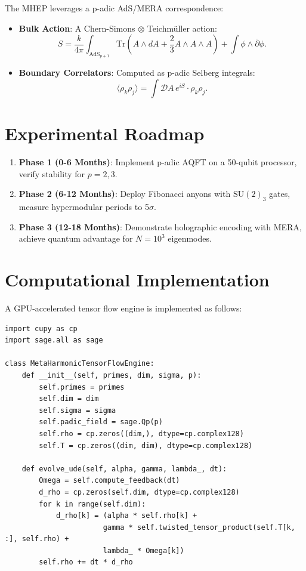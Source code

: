 \documentclass[11pt]{article}
\theoremstyle{plain}
\theoremstyle{definition}
\begin{document}
The MHEP leverages a p-adic AdS/MERA correspondence:
\begin{itemize}
    \item \textbf{Bulk Action}: A Chern-Simons \(\otimes\) Teichmüller action:
    \[
    S = \frac{k}{4\pi} \int_{\text{AdS}_{p+1}} \text{Tr}(A \wedge dA + \frac{2}{3} A \wedge A \wedge A) + \int \phi \wedge \overline{\partial} \phi.
    \]
    \item \textbf{Boundary Correlators}: Computed as p-adic Selberg integrals:
    \[
    \langle \rho_k \rho_j \rangle = \int \mathcal{D}A \, e^{i S} \cdot \rho_k \rho_j.
    \]
\end{itemize}

\section{Experimental Roadmap}

\begin{enumerate}
    \item \textbf{Phase 1 (0-6 Months)}: Implement p-adic AQFT on a 50-qubit processor, verify stability for \(p = 2, 3\).
    \item \textbf{Phase 2 (6-12 Months)}: Deploy Fibonacci anyons with \(\text{SU}(2)_3\) gates, measure hypermodular periods to 5\(\sigma\).
    \item \textbf{Phase 3 (12-18 Months)}: Demonstrate holographic encoding with MERA, achieve quantum advantage for \(N = 10^3\) eigenmodes.
\end{enumerate}

\section{Computational Implementation}
A GPU-accelerated tensor flow engine is implemented as follows:

\begin{verbatim}
import cupy as cp
import sage.all as sage

class MetaHarmonicTensorFlowEngine:
    def __init__(self, primes, dim, sigma, p):
        self.primes = primes
        self.dim = dim
        self.sigma = sigma
        self.padic_field = sage.Qp(p)
        self.rho = cp.zeros((dim,), dtype=cp.complex128)
        self.T = cp.zeros((dim, dim), dtype=cp.complex128)
    
    def evolve_ude(self, alpha, gamma, lambda_, dt):
        Omega = self.compute_feedback(dt)
        d_rho = cp.zeros(self.dim, dtype=cp.complex128)
        for k in range(self.dim):
            d_rho[k] = (alpha * self.rho[k] + 
                       gamma * self.twisted_tensor_product(self.T[k, :], self.rho) +
                       lambda_ * Omega[k])
        self.rho += dt * d_rho
\end{verbatim}
\end{document}
